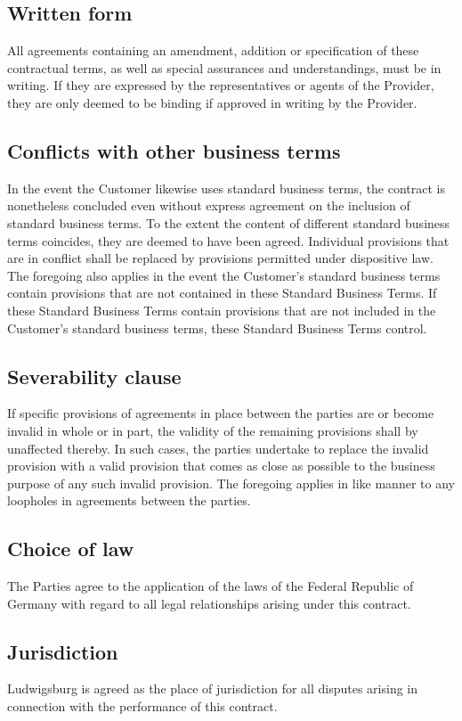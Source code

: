 \documentclass{terms}
\begin{document}
\subsection{Written form}
All agreements containing an amendment, addition or specification of these contractual terms, as well as special assurances and understandings, must be in writing.
If they are expressed by the representatives or agents of the Provider, they are only deemed to be binding if approved in writing by the Provider.

\subsection{Conflicts with other business terms}
In the event the Customer likewise uses standard business terms, the contract is nonetheless concluded even without express agreement on the inclusion of standard business terms.
To the extent the content of different standard business terms coincides, they are deemed to have been agreed.
Individual provisions that are in conflict shall be replaced by provisions permitted under dispositive law.
The foregoing also applies in the event the Customer's standard business terms contain provisions that are not contained in these Standard Business Terms.
If these Standard Business Terms contain provisions that are not included in the Customer's standard business terms, these Standard Business Terms control.

\subsection{Severability clause}
If specific provisions of agreements in place between the parties are or become invalid in whole or in part, the validity of the remaining provisions shall by unaffected thereby.
In such cases, the parties undertake to replace the invalid provision with a valid provision that comes as close as possible to the business purpose of any such invalid provision.
The foregoing applies in like manner to any loopholes in agreements between the parties.

\subsection{Choice of law}
The Parties agree to the application of the laws of the Federal Republic of Germany with regard to all legal relationships arising under this contract.

\subsection{Jurisdiction}
Ludwigsburg is agreed as the place of jurisdiction for all disputes arising in connection with the performance of this contract.
\end{document}

